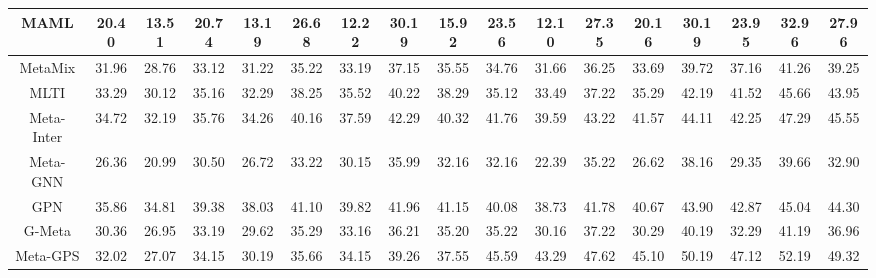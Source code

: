 \begin{table*}[ht]
{\begin{tabular}{@{}c|cccccccc|cccccccc@{}}
MAML                     & 20.40          & 13.51          & 20.74          & 13.19          & 26.68          & 12.22          & 30.19          & 15.92          & 23.56          & 12.10          & 27.35          & 20.16          & 30.19          & 23.95          & 32.96          & 27.96          \\ \midrule
MetaMix                   & 31.96          & 28.76          & 33.12          & 31.22          & 35.22          & 33.19          & 37.15          & 35.55          & 34.76          & 31.66          & 36.25          & 33.69          & 39.72          & 37.16          & 41.26          & 39.25 \\
MLTI                   & 33.29          & 30.12          & 35.16          & 32.29          & 38.25          & 35.52          & 40.22          & 38.29          & 35.12          & 33.49          & 37.22          & 35.29          & 42.19          & 41.52          & 45.66          & 43.95          \\
Meta-Inter                   & 34.72          & 32.19         & 35.76          & 34.26          & 40.16          & 37.59          & 42.29          & 40.32          & 41.76          & 39.59          & 43.22          & 41.57          & 44.11          & 42.25          & 47.29          & 45.55          \\ \midrule
Meta-GNN                 & 26.36          & 20.99          & 30.50          & 26.72          & 33.22          & 30.15          & 35.99          & 32.16          & 32.16          & 22.39          & 35.22          & 26.62          & 38.16          & 29.35          & 39.66          & 32.90          \\
GPN                      & 35.86    & 34.81    & 39.38    & 38.03    & 41.10    & 39.82    & 41.96    & 41.15    & 40.08          & 38.73          & 41.78          & 40.67          & 43.90          & 42.87          & 45.04          & 44.30          \\
G-Meta                   & 30.36          & 26.95          & 33.19          & 29.62          & 35.29          & 33.16          & 36.21          & 35.20          & 35.22          & 30.16          & 37.22          & 30.29          & 40.19          & 32.29          & 41.19          & 36.96          \\
Meta-GPS                 & 32.02          & 27.07          & 34.15          & 30.19          & 35.66          & 34.15          & 39.26          & 37.55          & 45.59          & 43.29          & 47.62          & 45.10          & 50.19          & 47.12          & 52.19          & 49.32          \\

\end{tabular}}
\end{table*}
